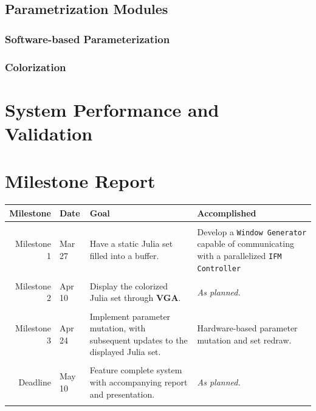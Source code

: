 \documentclass{article}
\begin{document}
\subsection{Parametrization Modules}

\subsubsection{Software-based Parameterization}

\subsubsection{Colorization}



\section{System Performance and Validation}

\section{Milestone Report}

\begin{tabular}{rlp{4.5cm}p{4.5cm}}
\textbf{Milestone}&\textbf{Date}&\textbf{Goal}&\textbf{Accomplished}\\ \hline
&&&\\
Milestone 1&Mar 27&Have a static Julia set filled into a buffer.&
	Develop a \texttt{Window Generator} capable of communicating with a parallelized \texttt{IFM Controller}\\
&&&\\
Milestone 2&Apr 10&Display the colorized Julia set through \textbf{VGA}.&\textit{As planned.}\\
&&&\\
Milestone 3&Apr 24&Implement parameter mutation, with subsequent updates to the displayed Julia set.&
	Hardware-based parameter mutation and set redraw.\\
&&&\\
Deadline&May 10&Feature complete system with accompanying report and presentation.&\textit{As planned.}\\
&&&\\
\end{tabular}
\end{document}
